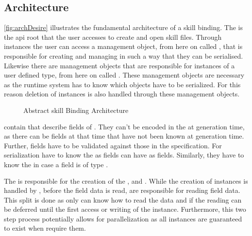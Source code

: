 \documentclass[thesis]{subfiles}
\begin{document}
  \subsection{Architecture}\label{sec:skillArch}
    \autoref{fig:archDesire} illustrates the fundamental architecture of a \gls{skill} binding.
    The \SkillFile is the \gls{api} root that the user accesses to create and open \gls{skill} files.
    Through \SkillFile instances the user can access a management object, from here on called \StringPool, that is responsible for creating and managing \Strings in such a way that they can be serialised.
    Likewise there are management objects that are responsible for instances of a user defined type, from here on called \UserTypePools.
    These management objects are necessary as the runtime system has to know which objects have to be serialized.
    For this reason deletion of instances is also handled through these management objects.%
    ~\autocite[107--112]{skill-dis}

    \begin{figure}[ht]
      \centering
      
      \caption{Abstract \gls{skill} Binding Architecture}\label{fig:archDesire}
    \end{figure}

    \UserTypePools contain \FieldDeclarations that describe fields of \UserTypes.
    They can't be encoded in the \UserTypePools at generation time, as there can be fields at that time that have not been known at generation time.
    Further, fields have to be validated against those in the specification.
    For serialization \FieldDeclarations have to know the \UserTypePools as \UserType fields can have \UserTypes as fields.
    Similarly, they have to know the \StringPool in case a field is of type \String.%
    ~\autocite[144--148]{skill-dis}

    The \FileReader is responsible for the creation of the \StringPool, \UserTypePools and \FieldDeclarations.
    While the creation of \UserType instances is handled by \UserTypePools, before the field data is read, \FieldDeclarations are responsible for reading field data.
    This split is done as only \FieldDeclarations can know how to read the data and if the reading can be deferred until the first access or writing of the instance.
    Furthermore, this two step process potentially allows for parallelization as all \UserType instances are guaranteed to exist when \FieldDeclarations require them.%
    ~\autocite[148f.]{skill-dis}
\end{document}
